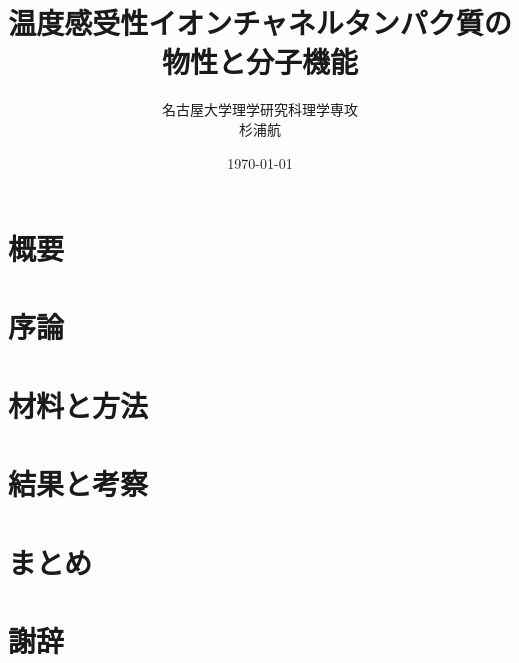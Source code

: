 \documentclass[a4paper, 14pt]{ltjsreport}
\title{温度感受性イオンチャネルタンパク質の物性と分子機能}
\author{名古屋大学理学研究科理学専攻\\杉浦航}
\date{\today}
\begin{document}
\maketitle

\chapter*{概要}


\tableofcontents
\clearpage

\chapter{序論}


\chapter{材料と方法}\label{chap:methods}


\chapter{結果と考察}


\chapter{まとめ}


\chapter*{謝辞}


\printbibliography[title=参考文献]
\end{document}
